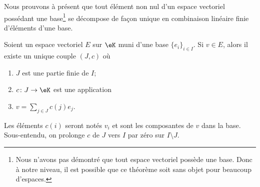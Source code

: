 Nous prouvons à présent que tout élément non nul d'un espace vectoriel possédant une base\footnote{Nous n'avons pas démontré que tout espace vectoriel possède une base. Donc à notre niveau, il est possible que ce théorème soit sans objet pour beaucoup d'espaces.} se décompose de façon unique en combinaison linéaire finie d'éléments d'une base.
\begin{proposition}      \label{PROPooEIQIooXfWDDV}
    Soient un espace vectoriel \( E\) sur \( \eK\) muni d'une base \( \{ e_i \}_{i\in I}\). Si \( v\in E\), alors il existe un unique couple \( (J, c)\) où
    \begin{enumerate}
        \item
            \( J\) est une partie finie de \( I\);
        \item
            \( c\colon J\to \eK\) est une application
        \item
            \( v=\sum_{j\in J}c(j)e_j\).
    \end{enumerate}
    Les éléments \( c(i)\) seront notés \( v_i\) et sont les composantes de \( v\) dans la base. Sous-entendu, on prolonge \( c\) de \( J\)  vers \( I\) par zéro sur \( I\setminus J\).
\end{proposition}

